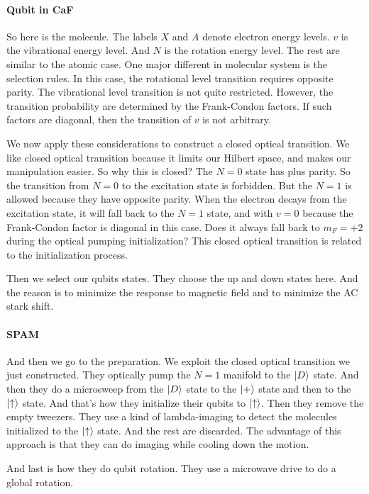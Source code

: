 \documentclass{article}
\begin{document}
\paragraph*{Qubit in CaF}
So here is the molecule.
The labels $X$ and $A$ denote electron energy levels.
$v$ is the vibrational energy level.
And $N$ is the rotation energy level.
The rest are similar to the atomic case.
One major different in molecular system is the selection rules.
In this case, the rotational level transition requires opposite parity.
The vibrational level transition is not quite restricted.
However, the transition probability are determined by the Frank-Condon factors.
If such factors are diagonal, then the transition of $v$ is not arbitrary.

We now apply these considerations to construct a closed optical transition.
We like closed optical transition because it limits our Hilbert space, and makes our manipulation easier.
So why this is closed?
The $N=0$ state has plus parity.
So the transition from $N=0$ to the excitation state is forbidden.
But the $N=1$ is allowed because they have opposite parity.
When the electron decays from the excitation state, it will fall back to the $N=1$ state, and with $v=0$ because the Frank-Condon factor is diagonal in this case.
{\color{red} Does it always fall back to $m_F=+2$ during the optical pumping initialization?}
This closed optical transition is related to the initialization process.

Then we select our qubits states.
They choose the up and down states here.
And the reason is to minimize the response to magnetic field and to minimize the AC stark shift.


\paragraph*{SPAM}
And then we go to the preparation.
We exploit the closed optical transition we just constructed.
They optically pump the $N=1$ manifold to the $\ket{D}$ state.
And then they do a microsweep from the $\ket{D}$ state to the $\ket{+}$ state and then to the $\ket{\uparrow}$ state.
And that's how they initialize their qubits to $\ket{\uparrow}$.
Then they remove the empty tweezers.
They use a kind of lambda-imaging to detect the molecules initialized to the $\ket{\uparrow}$ state.
And the rest are discarded.
The advantage of this approach is that they can do imaging while cooling down the motion.

And last is how they do qubit rotation.
They use a microwave drive to do a global rotation.
\end{document}
